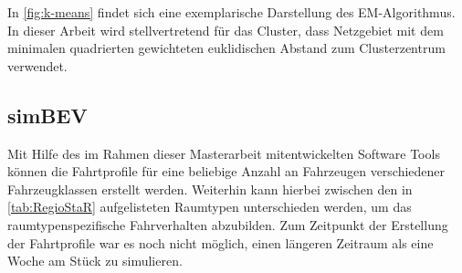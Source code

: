 In \autoref{fig:k-means} findet sich eine exemplarische Darstellung des EM-Algorithmus.
In dieser Arbeit wird stellvertretend für das Cluster, dass Netzgebiet mit dem minimalen quadrierten gewichteten euklidischen Abstand zum Clusterzentrum verwendet. \cite{Mueller2019}




\subsection{simBEV}\label{chap:simbev_theo}


Mit Hilfe des im Rahmen dieser Masterarbeit mitentwickelten Software Tools \simbev können die Fahrtprofile für eine beliebige Anzahl an Fahrzeugen verschiedener Fahrzeugklassen erstellt werden.
Weiterhin kann hierbei zwischen den in \autoref{tab:RegioStaR} aufgelisteten \Regiostar Raumtypen unterschieden werden, um das raumtypenspezifische Fahrverhalten abzubilden.
Zum Zeitpunkt der Erstellung der Fahrtprofile war es noch nicht möglich, einen längeren Zeitraum als eine Woche am Stück zu simulieren.



